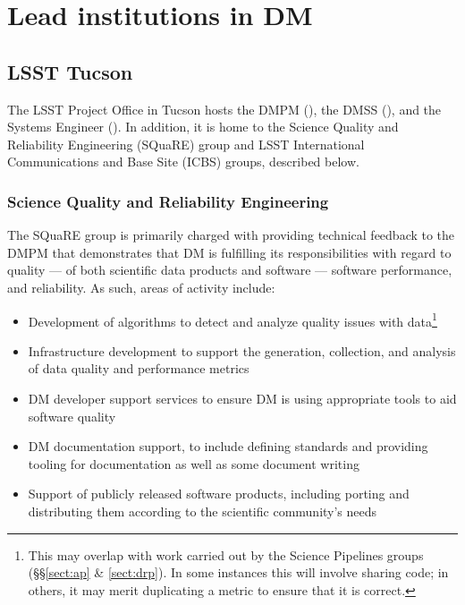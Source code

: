 \section{Lead institutions in \gls{DM} \label{sect:leadtutes}}

\subsection{LSST Tucson\label{sect:tucson}}

The \gls{LSST} Project Office in Tucson hosts the \gls{DMPM} (), the \gls{DMSS} (), and the \gls{Systems Engineer} ().
In addition, it is home to the Science Quality and Reliability Engineering (\gls{SQuaRE}) group and \gls{LSST} International Communications and Base Site (\gls{ICBS}) groups, described below.

\subsubsection{Science Quality and Reliability Engineering \label{sect:square}}

The \gls{SQuaRE} group is primarily charged with providing technical feedback to the \gls{DMPM} that demonstrates that \gls{DM} is fulfilling its responsibilities with regard to quality — of both scientific data products and software — software performance, and reliability. As such, areas of activity include:

\begin{itemize}

\item Development of algorithms to detect and analyze quality issues with data\footnote{This may overlap with work carried out by the \gls{Science Pipelines} groups (\S\S\ref{sect:ap} \& \ref{sect:drp}). In some instances this will involve sharing code; in others, it may merit duplicating a \gls{metric} to ensure that it is correct.}

\item Infrastructure development to support the generation, collection, and analysis of data quality and performance metrics

\item \gls{DM} developer support services to ensure \gls{DM} is using appropriate tools to aid software quality

\item \gls{DM} documentation support, to include defining standards and providing tooling for documentation as well as some document writing

\item Support of publicly released software products, including porting and distributing them according to the scientific community's needs

\end{itemize}

